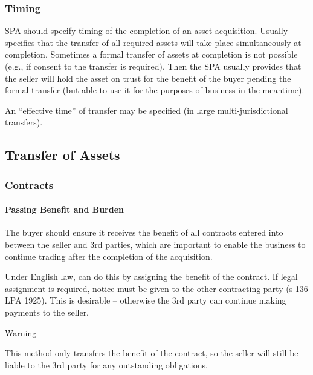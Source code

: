 \documentclass[
]{article}
\newenvironment{env-90909da5-8ae5-47a3-962b-d797b4450caf}
{
    \savenotes\tcolorbox[blanker,breakable,left=5pt,borderline west={2pt}{-4pt}{orange}]
}
{
    \endtcolorbox\spewnotes
}
\begin{document}
\hypertarget{timing}{%
\subsubsection{Timing}\label{timing}}

SPA should specify timing of the completion of an asset acquisition.
Usually specifies that the transfer of all required assets will take
place simultaneously at completion. Sometimes a formal transfer of
assets at completion is not possible (e.g., if consent to the transfer
is required). Then the SPA usually provides that the seller will hold
the asset on trust for the benefit of the buyer pending the formal
transfer (but able to use it for the purposes of business in the
meantime).

An ``effective time'' of transfer may be specified (in large
multi-jurisdictional transfers).

\hypertarget{transfer-of-assets}{%
\subsection{Transfer of Assets}\label{transfer-of-assets}}

\hypertarget{contracts}{%
\subsubsection{Contracts}\label{contracts}}

\hypertarget{passing-benefit-and-burden}{%
\paragraph{Passing Benefit and
Burden}\label{passing-benefit-and-burden}}

The buyer should ensure it receives the benefit of all contracts entered
into between the seller and 3rd parties, which are important to enable
the business to continue trading after the completion of the
acquisition.

Under English law, can do this by assigning the benefit of the contract.
If legal assignment is required, notice must be given to the other
contracting party (s 136 LPA 1925). This is desirable -- otherwise the
3rd party can continue making payments to the seller.

\begin{env-90909da5-8ae5-47a3-962b-d797b4450caf}

Warning

This method only transfers the benefit of the contract, so the seller
will still be liable to the 3rd party for any outstanding obligations.

\end{env-90909da5-8ae5-47a3-962b-d797b4450caf}
\end{document}
